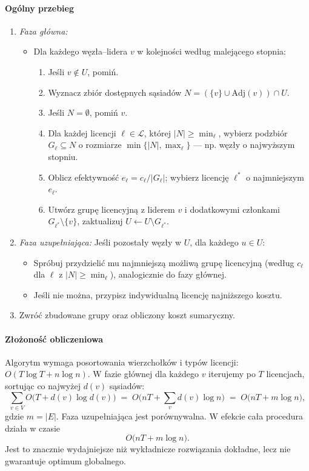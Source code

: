 \paragraph{Ogólny przebieg}
\begin{enumerate}
  \item \emph{Faza główna:}  
  \begin{itemize}
    \item Dla każdego węzła–lidera $v$ w kolejności według malejącego stopnia:
      \begin{enumerate}
        \item Jeśli $v\notin U$, pomiń.
        \item Wyznacz zbiór dostępnych sąsiadów $N = (\{v\}\cup \mathrm{Adj}(v))\cap U$.
        \item Jeśli $N=\emptyset$, pomiń $v$.
        \item Dla każdej licencji $\ell\in\mathcal{L}$, której $|N|\ge \min_\ell$, wybierz podzbiór $G_\ell\subseteq N$ o rozmiarze $\min\{|N|,\max_\ell\}$ — np. węzły o najwyższym stopniu.
        \item Oblicz efektywność $e_\ell = c_\ell/|G_\ell|$; wybierz licencję $\ell^*$ o najmniejszym $e_\ell$.
        \item Utwórz grupę licencyjną z liderem $v$ i dodatkowymi członkami $G_{\ell^*}\setminus\{v\}$, zaktualizuj $U \leftarrow U \setminus G_{\ell^*}$.
      \end{enumerate}
  \end{itemize}
  \item \emph{Faza uzupełniająca:}  
  Jeśli pozostały węzły w $U$, dla każdego $u\in U$:
  \begin{itemize}
    \item Spróbuj przydzielić mu najmniejszą możliwą grupę licencyjną (według $c_\ell$ dla $\ell$ z $|N|\ge\min_\ell$), analogicznie do fazy głównej.
    \item Jeśli nie można, przypisz indywidualną licencję najniższego kosztu.
  \end{itemize}
  \item Zwróć zbudowane grupy oraz obliczony koszt sumaryczny.
\end{enumerate}

\paragraph{Złożoność obliczeniowa}
Algorytm wymaga posortowania wierzchołków i typów licencji: $O(T\log T + n\log n)$.  
W fazie głównej dla każdego $v$ iterujemy po $T$ licencjach, sortując co najwyżej $d(v)$ sąsiadów:  
\[
  \sum_{v\in V} O\bigl(T + d(v)\log d(v)\bigr)
  \;=\; O\bigl(nT + \sum_v d(v)\log n\bigr)
  \;=\; O\bigl(nT + m\log n\bigr),
\]
gdzie $m=|E|$. Faza uzupełniająca jest porównywalna. W efekcie cała procedura działa w czasie
\[
  O\bigl(nT + m\log n\bigr).
\]
Jest to znacznie wydajniejsze niż wykładnicze rozwiązania dokładne, lecz nie gwarantuje optimum globalnego.  

